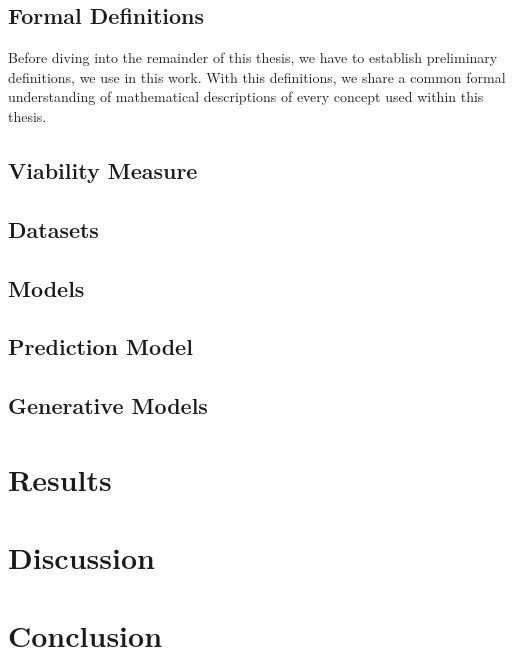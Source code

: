 \documentclass[12pt,a4paper]{report}
\begin{document}
\section{Formal Definitions}
\label{sec:formulas}
Before diving into the remainder of this thesis, we have to establish preliminary definitions, we use in this work. With this definitions, we share a common formal understanding of mathematical descriptions of every concept used within this thesis. 


\section{Viability Measure}
\label{sec:viability}


\section{Datasets}
\label{sec:datasets}


\section{Models}
\label{sec:models}

\section{Prediction Model}


\section{Generative Models}






\chapter{Results}
\label{sec:results}








\chapter{Discussion}
\label{sec:dicussion}


\chapter{Conclusion}
\label{sec:conclusion}


\printbibliography

\appendix
\end{document}
